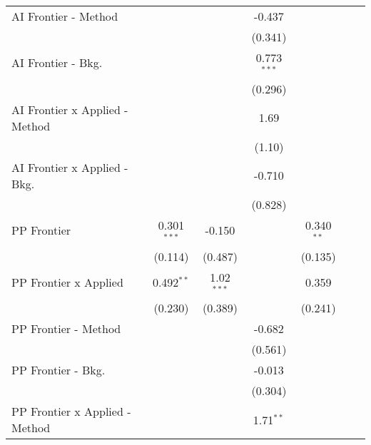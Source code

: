 \begin{tabular}{lcccccc}
   AI Frontier - Method           &               &              & -0.437        &              &        &   \\   
                                  &               &              & (0.341)       &              &        &   \\   
   AI Frontier - Bkg.             &               &              & 0.773$^{***}$ &              &        &   \\   
                                  &               &              & (0.296)       &              &        &   \\   
   AI Frontier x Applied - Method &               &              & 1.69          &              &        &   \\   
                                  &               &              & (1.10)        &              &        &   \\   
   AI Frontier x Applied - Bkg.   &               &              & -0.710        &              &        &   \\   
                                  &               &              & (0.828)       &              &        &   \\   
   PP Frontier                    & 0.301$^{***}$ & -0.150       &               & 0.340$^{**}$ &        &   \\   
                                  & (0.114)       & (0.487)      &               & (0.135)      &        &   \\   
   PP Frontier x Applied          & 0.492$^{**}$  & 1.02$^{***}$ &               & 0.359        &        &   \\   
                                  & (0.230)       & (0.389)      &               & (0.241)      &        &   \\   
   PP Frontier - Method           &               &              & -0.682        &              &        &   \\   
                                  &               &              & (0.561)       &              &        &   \\   
   PP Frontier - Bkg.             &               &              & -0.013        &              &        &   \\   
                                  &               &              & (0.304)       &              &        &   \\   
   PP Frontier x Applied - Method &               &              & 1.71$^{**}$   &              &        &   \\   

\end{tabular}
